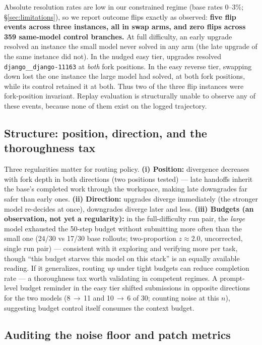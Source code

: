 \documentclass{article}
\begin{document}
Absolute resolution rates are low in our constrained regime (base rates 0--3\%; \S\ref{sec:limitations}), so we report outcome flips exactly as observed: \textbf{five flip events across three instances, all in swap arms, and zero flips across 359 same-model control branches.} At full difficulty, an early upgrade resolved an instance the small model never solved in any arm (the late upgrade of the same instance did not). In the nudged easy tier, upgrades resolved \texttt{django\_\_django-11163} at \emph{both} fork positions. In the easy reverse tier, swapping down lost the one instance the large model had solved, at both fork positions, while its control retained it at both. Thus two of the three flip instances were fork-position invariant. Replay evaluation is structurally unable to observe any of these events, because none of them exist on the logged trajectory.

\subsection{Structure: position, direction, and the thoroughness tax}\label{sec:structure}

Three regularities matter for routing policy. \textbf{(i) Position:} divergence decreases with fork depth in both directions (two positions tested) --- late handoffs inherit the base's completed work through the workspace, making late downgrades far safer than early ones. \textbf{(ii) Direction:} upgrades diverge immediately (the stronger model re-decides at once), downgrades diverge later and less. \textbf{(iii) Budgets (an observation, not yet a regularity):} in the full-difficulty run pair, the \emph{large} model exhausted the 50-step budget without submitting more often than the small one (24/30 vs 17/30 base rollouts; two-proportion $z\!\approx\!2.0$, uncorrected, single run pair) --- consistent with it exploring and verifying more per task, though ``this budget starves this model on this stack'' is an equally available reading. If it generalizes, routing \emph{up} under tight budgets can reduce completion rate --- a thoroughness tax worth validating in competent regimes. A prompt-level budget reminder in the easy tier shifted submissions in opposite directions for the two models (8\,$\to$\,11 and 10\,$\to$\,6 of 30; counting noise at this $n$), suggesting budget control itself consumes the context budget.

\subsection{Auditing the noise floor and patch metrics}\label{sec:audit}
\end{document}
